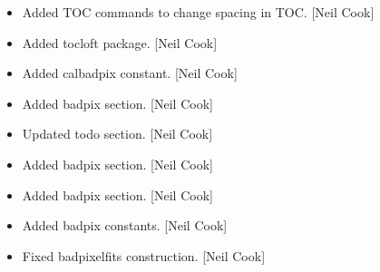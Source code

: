 \documentclass[a4paper,10pt,english]{report}
\begin{document}
\begin{itemize}
\item {} 
Added TOC commands to change spacing in TOC. {[}Neil Cook{]}

\item {} 
Added tocloft package. {[}Neil Cook{]}

\item {} 
Added calbadpix constant. {[}Neil Cook{]}

\item {} 
Added badpix section. {[}Neil Cook{]}

\item {} 
Updated todo section. {[}Neil Cook{]}

\item {} 
Added badpix section. {[}Neil Cook{]}

\item {} 
Added badpix section. {[}Neil Cook{]}

\item {} 
Added badpix constants. {[}Neil Cook{]}

\item {} 
Fixed badpixelfits construction. {[}Neil Cook{]}

\end{itemize}
\end{document}
